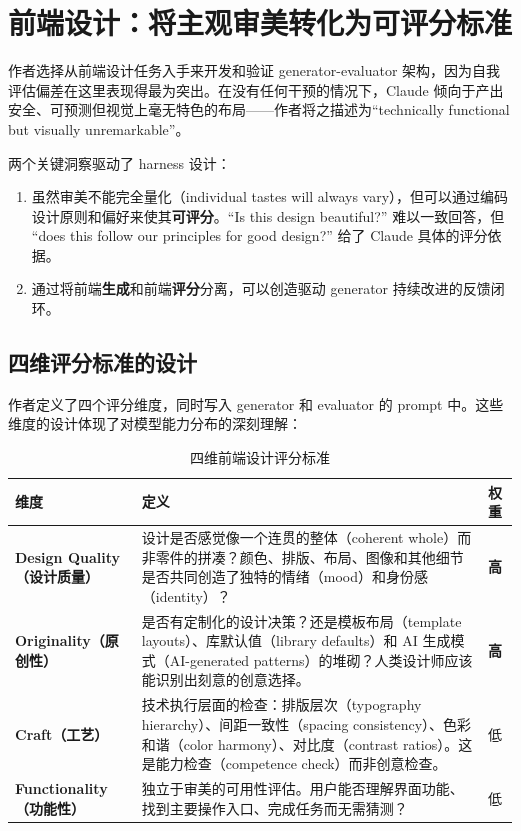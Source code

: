 \section{前端设计：将主观审美转化为可评分标准}

作者选择从前端设计任务入手来开发和验证 generator-evaluator 架构，因为自我评估偏差在这里表现得最为突出。在没有任何干预的情况下，Claude 倾向于产出安全、可预测但视觉上毫无特色的布局——作者将之描述为``technically functional but visually unremarkable''。

两个关键洞察驱动了 harness 设计：

\begin{enumerate}[leftmargin=1.5em]
    \item 虽然审美不能完全量化（individual tastes will always vary），但可以通过编码设计原则和偏好来使其\textbf{可评分}。``Is this design beautiful?'' 难以一致回答，但 ``does this follow our principles for good design?'' 给了 Claude 具体的评分依据。
    \item 通过将前端\textbf{生成}和前端\textbf{评分}分离，可以创造驱动 generator 持续改进的反馈闭环。
\end{enumerate}

\subsection{四维评分标准的设计}

作者定义了四个评分维度，同时写入 generator 和 evaluator 的 prompt 中。这些维度的设计体现了对模型能力分布的深刻理解：

\begin{table}[H]
\centering
\renewcommand{\arraystretch}{1.4}
\begin{tabular}{>{\bfseries}p{2.8cm}p{7.5cm}p{1.5cm}}
\toprule
维度 & 定义 & 权重 \\
\midrule
Design Quality（设计质量） & 设计是否感觉像一个连贯的整体（coherent whole）而非零件的拼凑？颜色、排版、布局、图像和其他细节是否共同创造了独特的情绪（mood）和身份感（identity）？ & \textbf{高} \\
\midrule
Originality（原创性） & 是否有定制化的设计决策？还是模板布局（template layouts）、库默认值（library defaults）和 AI 生成模式（AI-generated patterns）的堆砌？人类设计师应该能识别出刻意的创意选择。 & \textbf{高} \\
\midrule
Craft（工艺） & 技术执行层面的检查：排版层次（typography hierarchy）、间距一致性（spacing consistency）、色彩和谐（color harmony）、对比度（contrast ratios）。这是能力检查（competence check）而非创意检查。 & 低 \\
\midrule
Functionality（功能性） & 独立于审美的可用性评估。用户能否理解界面功能、找到主要操作入口、完成任务而无需猜测？ & 低 \\
\bottomrule
\end{tabular}
\caption{四维前端设计评分标准}
\end{table}

